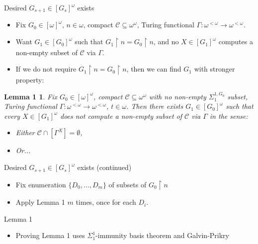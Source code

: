 \documentclass[notes]{beamer}
\begin{document}
\begin{frame}{Desired $G_{s+1}\in[G_s]^\omega$ exists}
  \begin{itemize}
    \item Fix $G_0\in[\omega]^\omega$, $n\in\omega$, compact
      $\mathcal{C}\subseteq\omega^\omega$, Turing functional
      $\Gamma:\omega^{<\omega} \rightarrow \omega^{<\omega}$.

    \item Want $G_1\in[G_0]^\omega$ such that $G_1\restriction
      n=G_0\restriction n$, and no $X\in[G_1]^\omega$ computes a non-empty
      subset of $\mathcal{C}$ via $\Gamma$.

    \item If we do not require $G_1\restriction n=G_0\restriction n$, then
      we can find $G_1$ with stronger property:
  \end{itemize}

  \newtheorem{L1}{Lemma 1}
  \begin{L1}
    Fix $G_0\in[\omega]^\omega$, compact
    $\mathcal{C}\subseteq\omega^\omega$ with no non-empty
    $\Sigma_1^{1,G_0}$ subset, Turing functional $\Gamma:\omega^{<\omega}
    \rightarrow \omega^{<\omega}$, $t\in\omega$. Then there exists
    $G_1\in[G_0]^\omega$ such that every $X\in[G_1]^\omega$ does not
    compute a non-empty subset of $\mathcal{C}$ via $\Gamma$ in the
    sense:

    \begin{itemize}
      \item Either $\mathcal{C}\cap[\Gamma^X]=\emptyset$,
      \item Or...
    \end{itemize}
  \end{L1}
\end{frame}

\begin{frame}{Desired $G_{s+1}\in[G_s]^\omega$ exists (continued)}
  \begin{itemize}
      \item Fix enumeration $\{D_0,\ldots,D_m\}$ of subsets of
        $G_0\restriction n$

      \item Apply Lemma 1 $m$ times, once for each $D_i$.
  \end{itemize}
\end{frame}

\begin{frame}{Lemma 1}
  \begin{itemize}
    \item Proving Lemma 1 uses $\Sigma_1^1$-immunity basis theorem and
      Galvin-Prikry
  \end{itemize}
\end{frame}
\end{document}
